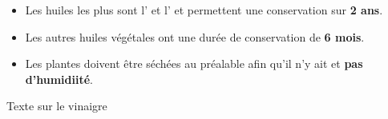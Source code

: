 \begin{Remarque}[]%
    \begin{itemize}[label=\faPen]
        \item Les huiles les plus  sont l' et l' et permettent une conservation sur \textbf{2 ans}. \\
        \item Les autres huiles végétales ont une durée de conservation de \textbf{6 mois}.
        \item Les plantes doivent être séchées au préalable afin qu'il n'y ait  et \textbf{pas d'humidiité}.
    \end{itemize}
\end{Remarque}
Texte sur le vinaigre

